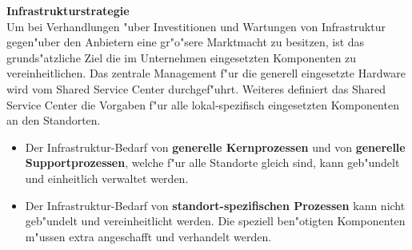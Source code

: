 \textbf{Infrastrukturstrategie}\\
Um bei Verhandlungen "uber Investitionen und Wartungen von Infrastruktur gegen"uber den Anbietern eine gr"o"sere Marktmacht zu besitzen, ist das grunds"atzliche Ziel die im Unternehmen eingesetzten Komponenten zu vereinheitlichen. Das zentrale Management f"ur die generell eingesetzte Hardware wird vom Shared Service Center durchgef"uhrt. Weiteres definiert das Shared Service Center die Vorgaben f"ur alle lokal-spezifisch eingesetzten Komponenten an den Standorten.

\begin{itemize}

	\item Der Infrastruktur-Bedarf von \textbf{generelle Kernprozessen} und von \textbf{generelle Supportprozessen}, welche f"ur alle Standorte gleich sind, kann geb"undelt und einheitlich verwaltet werden. 

	\item Der Infrastruktur-Bedarf von \textbf{standort-spezifischen Prozessen} kann nicht geb"undelt und vereinheitlicht werden. Die speziell ben"otigten Komponenten m"ussen extra angeschafft und verhandelt werden.

\end{itemize}

